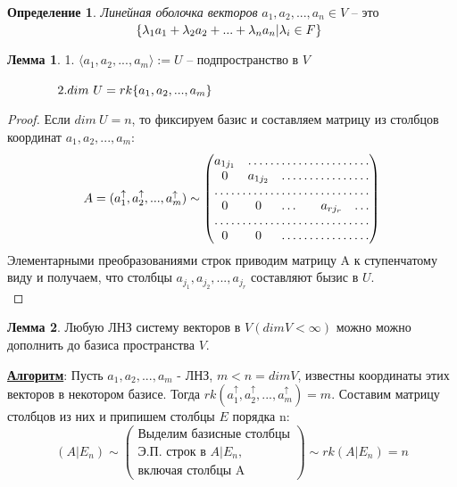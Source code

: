 \documentclass[a4paper, 12pt]{article}
\newcommand\tab[1][.5cm]{\hspace*{#1}}
\theoremstyle{definition}
\newtheorem*{definition}{Определение}
\newtheorem*{lemma}{Лемма}
\begin{document}
    \begin{definition}
        \textit{Линейная оболочка векторов} $a_1, a_2,...,a_n
        \in V$ -- это\\ $\tab[3.6cm]\{\lambda_1a_1 + \lambda_2a_2 + ... + 
        \lambda_na_n|\lambda_i \in F\}$
    \end{definition}
    \begin{lemma}
        1. $\langle a_1, a_2,..., a_m \rangle := U$ -- подпространство в $V$

        $\tab[1.4cm]2. dim\ U = rk\{a_1, a_2,..., a_m\}$
    \end{lemma}
    \begin{proof}
        Если $dim\ U = n$, то фиксируем базис и составляем
        матрицу из столбцов координат $a_1, a_2,..., a_m:$
        $$A = (a_1^\uparrow, a_2^\uparrow,...,a_m^\uparrow)\sim
        \begin{pmatrix}
            a_{1j_1} & \hdotsfor{7}\\
            0 & a_{1j_2} & \hdotsfor{6}\\
            \hdotsfor{8}\\
            0 & 0 & \dots & \hdotsfor{3} & a_{rj_r} & \dots\\
            \hdotsfor{8}\\
            0 & 0 & \hdotsfor{6}
        \end{pmatrix}$$
        Элементарными преобразованиями строк приводим матрицу A
        к ступенчатому виду и получаем, что столбцы $a_{j_1},
        a_{j_2},..., a_{j_r}$ составляют бызис в $U$.\\
    \end{proof}
    \begin{lemma}
        Любую ЛНЗ систему векторов в $V (dimV < \infty)$ можно
        можно дополнить до базиса пространства $V$.
    \end{lemma}
    \underline{\textbf{Алгоритм}}: Пусть $a_1, a_2,..., a_m$ - ЛНЗ,
    $m < n = dimV$, известны координаты этих векторов в
    некотором базисе. Тогда $rk(a_1^\uparrow, a_2^\uparrow,...,
    a_m^\uparrow) = m.$ Составим матрицу столбцов из них и
    припишем столбцы $E$ порядка n:
    $$(A|E_n) \sim 
    \begin{pmatrix}
        \text{Выделим базисные столбцы}\\
        \text{Э.П. строк в \(A|E_n\),}\\
        \text{включая столбцы A}
    \end{pmatrix}
    \sim rk(A|E_n) = n$$\\
\end{document}
